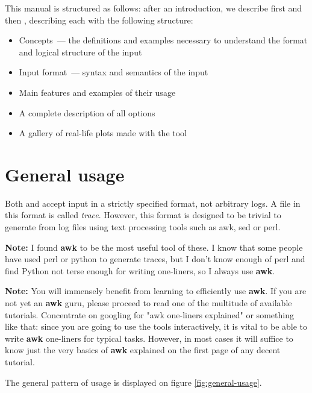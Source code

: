 \documentclass{article}
\begin{document}
This manual is structured as follows: after an introduction, we describe first \splot{} and then \timeplot{}, describing each with the following structure:

\begin{itemize}
\item Concepts~--- the definitions and examples necessary to understand the format and logical structure of the input
\item Input format~--- syntax and semantics of the input
\item Main features and examples of their usage
\item A complete description of all options
\item A gallery of real-life plots made with the tool
\end{itemize}

\section{General usage}
Both \timeplot{} and \splot{} accept input in a strictly specified format, not arbitrary logs. A file in this format is called \emph{trace}. However, this format is designed to be trivial to generate from log files using text processing tools such as awk, sed or perl.

\def\awk{\textbf{awk}}

\textbf{Note:} I found \awk{} to be the most useful tool of these. I know that some people have used perl or python to generate traces, but I don't know enough of perl and find Python not terse enough for writing one-liners, so I always use \awk{}.

\textbf{Note:} You will immensely benefit from learning to efficiently use \awk{}. If you are not yet an \awk{} guru, please proceed to read one of the multitude of available tutorials. Concentrate on googling for "awk one-liners explained" or something like that: since you are going to use the tools interactively, it is vital to be able to write \awk{} one-liners for typical tasks. However, in most cases it will suffice to know just the very basics of \awk{} explained on the first page of any decent tutorial.

The general pattern of usage is displayed on figure \ref{fig:general-usage}.
\end{document}

